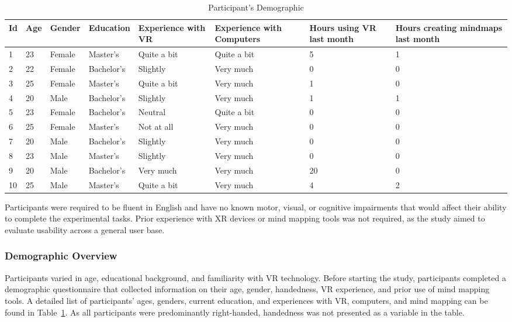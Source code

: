 \documentclass{CPP}
\begin{document}
\begin{table}[h!]
\centering
\begin{tabular}{|p{1cm}|p{1cm}|p{2cm}|p{2cm}|p{2cm}|p{2cm}|p{1cm}|p{2cm}|}
\hline
Id & Age & Gender & Education & Experience with VR & Experience with Computers & Hours using VR last month & Hours creating mindmaps last month\\ \hline
1 & 23 & Female & Master's & Quite a bit & Quite a bit & 5 & 1 \\ \hline
2 & 22 & Female & Bachelor's & Slightly & Very much & 0 & 0 \\ \hline
3 & 25 & Female & Master's & Quite a bit & Very much & 1 & 0 \\ \hline
4 & 20 & Male & Bachelor's & Slightly & Very much & 1 & 1 \\ \hline
5 & 23 & Female & Bachelor's & Neutral & Quite a bit & 0 & 0 \\ \hline
6 & 25 & Female & Master's & Not at all & Very much & 0 & 0 \\ \hline
7 & 20 & Male & Bachelor's & Slightly & Very much & 0 & 0 \\ \hline
8 & 23 & Male & Master's & Slightly & Very much & 0 & 0 \\ \hline
9 & 20 & Male & Bachelor's & Very much & Very much & 20 & 0 \\ \hline
10 & 25 & Male & Master's & Quite a bit & Very much & 4 & 2 \\ \hline
\end{tabular}
\caption{Participant's Demographic}
\label{table:demographic}
\end{table}

Participants were required to be fluent in English and have no known motor, visual, or cognitive impairments that would affect their ability to complete the experimental tasks. Prior experience with XR devices or mind mapping tools was not required, as the study aimed to evaluate usability across a general user base.

\subsubsection{Demographic Overview}

Participants varied in age, educational background, and familiarity with VR technology. Before starting the study, participants completed a demographic questionnaire that collected information on their age, gender, handedness, VR experience, and prior use of mind mapping tools.
A detailed list of participants’ ages, genders, current education, and experiences with VR, computers, and mind mapping can be found in Table~\ref{table:demographic}. As all participants were predominantly right-handed, handedness was not presented as a variable in the table.
\end{document}
